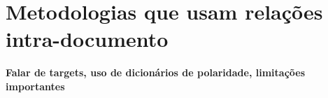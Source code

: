 \chapter{Metodologias que usam relações intra-documento}
\label{outros}
\textbf{Falar de targets, uso de dicionários de polaridade, limitações importantes}

